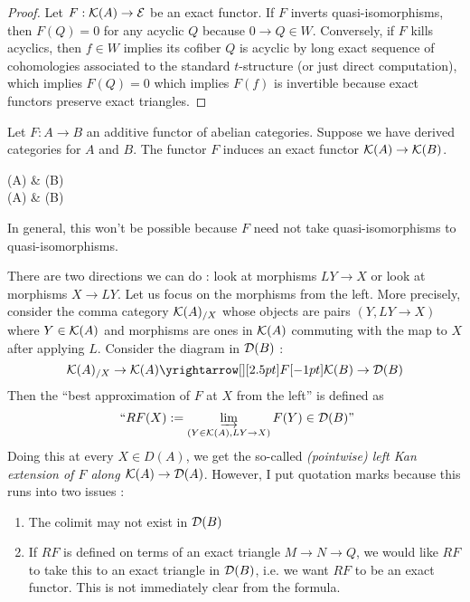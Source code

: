\documentclass{article}
\begin{document}
\begin{proof}
  Let $F : \mathcal{K}(A) \to \mathcal{E}$ be an exact functor.
  If $F$ inverts quasi-isomorphisms,
  then $F(Q) = 0$ for any acyclic $Q$ because $0 \to Q \in W$.
  Conversely, if $F$ kills acyclics,
  then $f \in W$ implies its cofiber $Q$ is acyclic by long exact
  sequence of cohomologies associated to the standard $t$-structure 
  (or just direct computation),
  which implies $F(Q) = 0$ which implies $F(f)$ is invertible
  because exact functors preserve exact triangles.
\end{proof}
Let $F : A \to B$ an additive functor of abelian categories.
Suppose we have derived categories for $A$ and $B$.
The functor $F$ induces an exact functor $\mathcal{K}(A) \to \mathcal{K}(B)$.
\begin{center}
\end{center}
\begin{cd}
  {(A)} & {(B)} \\
	{(A)} & {(B)}
	\arrow["F", from=1-1, to=1-2]
	\arrow[from=1-1, to=2-1]
	\arrow[from=1-2, to=2-2]
	\arrow["{?}", dashed, from=2-1, to=2-2]
\end{cd}
In general, this won't be possible because
$F$ need not take quasi-isomorphisms to quasi-isomorphisms.
\begin{center}
\end{center}
There are two directions we can do : look at morphisms $LY \to X$
or look at morphisms $X \to LY$.
Let us focus on the morphisms from the left.
More precisely, consider the comma category $\mathcal{K}(A)_{/ X}$
whose objects are pairs $(Y , L Y \to X)$ where $Y \in \mathcal{K}(A)$
and morphisms are ones in $\mathcal{K}(A)$ commuting with
the map to $X$ after applying $L$.
Consider the diagram in $\mathcal{D}(B)$ : 
\[
  \cK(A)_{/X} \to \cK(A) \map{F}{} \cK(B) \to \cD(B)
\]
Then the ``best approximation of $F$ at $X$ from the left'' is defined as
\[
  \text{ ``$RF(X) := \varinjlim_{(Y \in \mathcal{K}(A) , LY \to X)} F(Y) \in \mathcal{D}(B)$''}
\]
Doing this at every $X \in D(A)$, 
we get the so-called \emph{(pointwise) 
  left Kan extension of $F$ along $\mathcal{K}(A) \to \mathcal{D}(A)$}.\cite[
    \href{https://kerodon.net/tag/0300}{Tag 0300}
    ]{kerodon}
However, I put quotation marks because this runs into two issues : 
\begin{enumerate}
  \item The colimit may not exist in $\mathcal{D}(B)$
  \item If $RF$ is defined
  on terms of an exact triangle $M \to N \to Q$,
  we would like $RF$ to take this to an exact triangle in $\mathcal{D}(B)$,
  i.e. we want $RF$ to be an exact functor.
  This is not immediately clear from the formula.
\end{enumerate}
\end{document}
